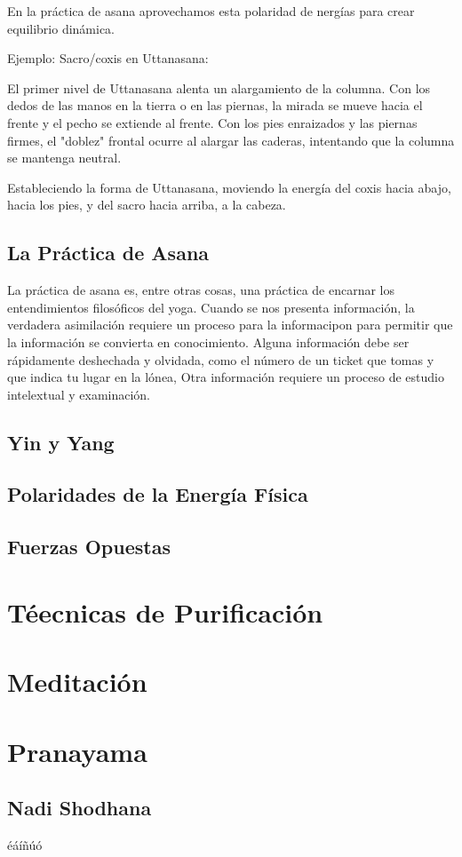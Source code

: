 En la práctica de asana aprovechamos esta polaridad de nergías para crear equilibrio dinámica.

Ejemplo: Sacro/coxis en Uttanasana:

El primer nivel de Uttanasana alenta un alargamiento de la columna. Con los dedos de las manos en la tierra o en las piernas, la mirada se mueve hacia el frente y el pecho se extiende al frente. Con los pies enraizados y las piernas firmes, el "doblez" frontal ocurre al alargar las caderas, intentando que la columna se mantenga neutral.

Estableciendo la forma de Uttanasana, moviendo la energía del coxis hacia abajo, hacia los pies, y del sacro hacia arriba, a la cabeza.

\subsection{La Práctica de Asana}
La práctica de asana es, entre otras cosas, una práctica de encarnar los entendimientos filosóficos del yoga. Cuando se nos presenta información, la verdadera asimilación requiere un proceso para la informacipon para permitir que la información se convierta en conocimiento. Alguna información debe ser rápidamente deshechada y olvidada, como el número de un ticket que tomas y que indica tu lugar en la lónea, Otra información requiere un proceso de estudio intelextual y examinación.


\subsection{Yin y Yang}
\subsection{Polaridades de la Energía Física}
\subsection{Fuerzas Opuestas}
\section{Téecnicas de Purificación}
\section{Meditación}
\section{Pranayama}
\subsection{Nadi Shodhana}


éáíñúó



























